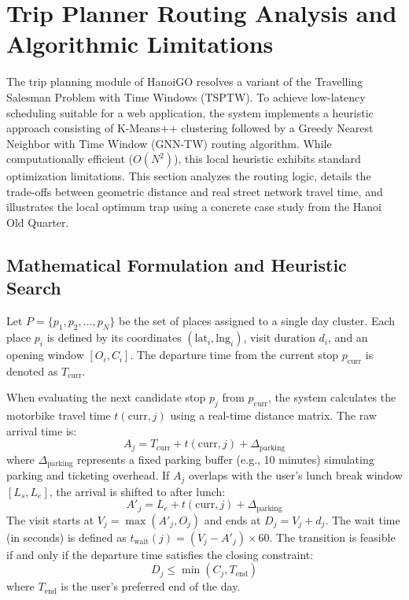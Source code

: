 
\section{Trip Planner Routing Analysis and Algorithmic Limitations}

The trip planning module of HanoiGO resolves a variant of the Travelling Salesman Problem with Time Windows (TSPTW). To achieve low-latency scheduling suitable for a web application, the system implements a heuristic approach consisting of K-Means++ clustering followed by a Greedy Nearest Neighbor with Time Window (GNN-TW) routing algorithm. While computationally efficient ($O(N^2)$), this local heuristic exhibits standard optimization limitations. This section analyzes the routing logic, details the trade-offs between geometric distance and real street network travel time, and illustrates the local optimum trap using a concrete case study from the Hanoi Old Quarter.

\subsection{Mathematical Formulation and Heuristic Search}

Let $P = \{p_1, p_2, \dots, p_N\}$ be the set of places assigned to a single day cluster. Each place $p_i$ is defined by its coordinates $(\text{lat}_i, \text{lng}_i)$, visit duration $d_i$, and an opening window $[O_i, C_i]$. The departure time from the current stop $p_{\text{curr}}$ is denoted as $T_{\text{curr}}$. 

When evaluating the next candidate stop $p_j$ from $p_{\text{curr}}$, the system calculates the motorbike travel time $t(\text{curr}, j)$ using a real-time distance matrix. The raw arrival time is:
\begin{equation}
A_j = T_{\text{curr}} + t(\text{curr}, j) + \Delta_{\text{parking}}
\end{equation}
where $\Delta_{\text{parking}}$ represents a fixed parking buffer (e.g., 10 minutes) simulating parking and ticketing overhead. If $A_j$ overlaps with the user's lunch break window $[L_s, L_e]$, the arrival is shifted to after lunch:
\begin{equation}
A'_j = L_e + t(\text{curr}, j) + \Delta_{\text{parking}}
\end{equation}
The visit starts at $V_j = \max(A'_j, O_j)$ and ends at $D_j = V_j + d_j$. The wait time (in seconds) is defined as $t_{\text{wait}}(j) = (V_j - A'_j) \times 60$. The transition is feasible if and only if the departure time satisfies the closing constraint:
\begin{equation}
D_j \le \min(C_j, T_{\text{end}})
\end{equation}
where $T_{\text{end}}$ is the user's preferred end of the day.

